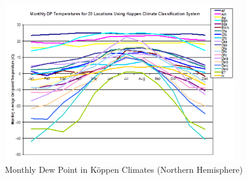 \begin{figure}[hbtp] %
\centering
\includegraphics[width=0.9\textwidth, height=0.9\textheight, keepaspectratio=true]{media/image012.png}
\caption{Monthly Dew Point in Köppen Climates (Northern Hemisphere) \protect \label{fig:monthly-dew-point-in-kppen-climates-northern}}
\end{figure}
